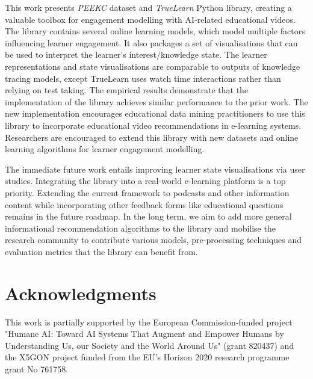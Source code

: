 \documentclass[letterpaper]{article} %
\begin{document}
{This work presents \textit{PEEKC} dataset and \textit{TrueLearn} Python library, creating a valuable toolbox for engagement modelling with AI-related educational videos. The library contains several online learning models, which model multiple factors influencing learner engagement. It also packages a set of visualisations that can be used to interpret the learner's interest/knowledge state. The learner representations and state visualisations are comparable to outputs of knowledge tracing models, except TrueLearn uses watch time interactions rather than relying on test taking. The empirical results demonstrate that the implementation of the library achieves similar performance to the prior work. The new implementation encourages educational data mining practitioners to use this library to incorporate educational video recommendations in e-learning systems. Researchers are encouraged to extend this library with new datasets and online learning algorithms for learner engagement modelling.}

The immediate future work entails improving learner state visualisations via user studies.
Integrating the library into a real-world e-learning platform \cite{10.1145/3397482.3450721} is a top priority.
Extending the current framework to podcasts and other information content while incorporating other feedback forms like educational questions \cite{bulathwela2023scalable,bulath2023neurips} remains in the future roadmap.
In the long term, we aim to add more general informational recommendation algorithms to the library and mobilise the research community to contribute various models, pre-processing techniques and evaluation metrics that the library can benefit from.

\section{Acknowledgments}
This work is partially supported by the European Commission-funded project "Humane AI: Toward AI Systems That Augment and Empower Humans by Understanding Us, our Society and the World Around Us" (grant 820437) and the X5GON project funded from the EU's Horizon 2020 research programme grant No 761758.
\end{document}

